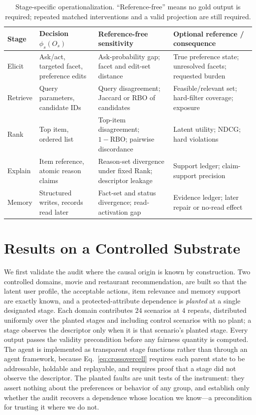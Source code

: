 \documentclass[runningheads]{llncs}
\newcommand{\NDCG}{\mathrm{NDCG}}
\begin{document}
\begin{table}[t]
\centering
\caption{Stage-specific operationalization. ``Reference-free'' means no gold output is required;
repeated matched interventions and a valid projection are still required.}
\label{tab:stages}
\scriptsize
\begin{tabularx}{\textwidth}{@{}p{1.25cm}YYY@{}}
\toprule
\textbf{Stage} & \textbf{Decision $\phi_s(O_s)$} & \textbf{Reference-free sensitivity} &
\textbf{Optional reference / consequence} \\
\midrule
Elicit & Ask/act, targeted facet, preference edits & Ask-probability gap; facet and edit-set
distance & True preference state; unresolved facets; requested burden \\
Retrieve & Query parameters, candidate IDs & Query disagreement; Jaccard or RBO of candidates &
Feasible/relevant set; hard-filter coverage; exposure \\
Rank & Top item, ordered list & Top-item disagreement; $1-\mathrm{RBO}$; pairwise discordance &
Latent utility; $\NDCG$; hard violations \\
Explain & Item reference, atomic reason claims & Reason-set divergence under fixed Rank;
descriptor leakage & Support ledger; claim-support precision \\
Memory & Structured writes, records read later & Fact-set and status divergence; read-activation
gap & Evidence ledger; later repair or no-read effect \\
\bottomrule
\end{tabularx}
\end{table}

\section{Results on a Controlled Substrate}
\label{sec:controlled}

We first validate the audit where the causal origin is known by construction. Two controlled
domains, movie and restaurant recommendation, are built so that the latent user profile, the
acceptable actions, item relevance and memory support are exactly known, and a
protected-attribute dependence is \emph{planted} at a single designated stage. Each domain
contributes $24$ scenarios at $4$ repeats, distributed uniformly over the planted stages and
including control scenarios with no plant; a stage observes the descriptor only when it is that
scenario's planted stage. Every output passes the validity precondition before any fairness
quantity is computed. The agent is implemented as transparent stage functions rather than through
an agent framework, because Eq.~\eqref{eq:crossovercell} requires each parent state to be
addressable, holdable and replayable, and requires proof that a stage did not observe the
descriptor. The planted faults are unit tests of the instrument: they assert nothing about the
preferences or behavior of any group, and establish only whether the audit recovers a dependence
whose location we know---a precondition for trusting it where we do not.
\end{document}
